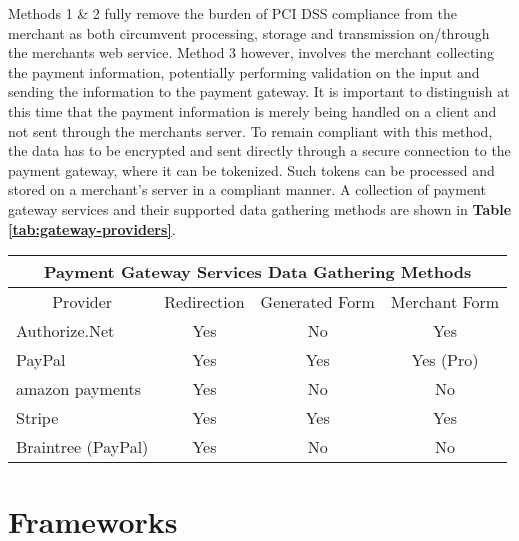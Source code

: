 Methods 1 \& 2 fully remove the burden of PCI DSS compliance from the merchant as both circumvent processing, storage and transmission on/through the merchants web service. Method 3 however, involves the merchant collecting the payment information, potentially performing validation on the input and sending the information to the payment gateway. It is important to distinguish at this time that the payment information is merely being handled on a client and not sent through the merchants server. To remain compliant with this method, the data has to be encrypted and sent directly through a secure connection to the payment gateway, where it can be tokenized. Such tokens can be processed and stored on a merchant's server in a compliant manner. A collection of payment gateway services and their supported data gathering methods are shown in \textbf{Table \ref{tab:gateway-providers}}. \\

\begin{center}
\begin{tabular}{ |p{3.5cm}|p{1.75cm}|p{2cm}|p{2cm}|  }
 \hline
 	\multicolumn{4}{|c|}{Payment Gateway Services Data Gathering Methods} \\
 \hline
 	\multicolumn{1}{|c|}{Provider} &
 	\multicolumn{1}{|c|}{Redirection} &
 	\multicolumn{1}{|c|}{Generated Form} &
 	\multicolumn{1}{|c|}{Merchant Form}  \\
 \hline
 	Authorize.Net\cite{authorize-net} & \multicolumn{1}{|c|}{Yes} & \multicolumn{1}{|c|}{No} & \multicolumn{1}{|c|}{Yes} \\
 \hline
 	PayPal\cite{paypal} & \multicolumn{1}{|c|}{Yes} & \multicolumn{1}{|c|}{Yes} & \multicolumn{1}{|c|}{Yes (Pro)} \\
 \hline
 	amazon payments\cite{amazon-payments} & \multicolumn{1}{|c|}{Yes} & \multicolumn{1}{|c|}{No} & \multicolumn{1}{|c|}{No} \\
 \hline
    Stripe\cite{stripe} & \multicolumn{1}{|c|}{Yes} & \multicolumn{1}{|c|}{Yes} & \multicolumn{1}{|c|}{Yes} \\
 \hline
 	Braintree (PayPal)\cite{braintree} & \multicolumn{1}{|c|}{Yes} & \multicolumn{1}{|c|}{No} & \multicolumn{1}{|c|}{No} \\
 \hline
\end{tabular}
\label{tab:gateway-providers}
\end{center}

\section{Frameworks}
\label{sec:frameworks}

